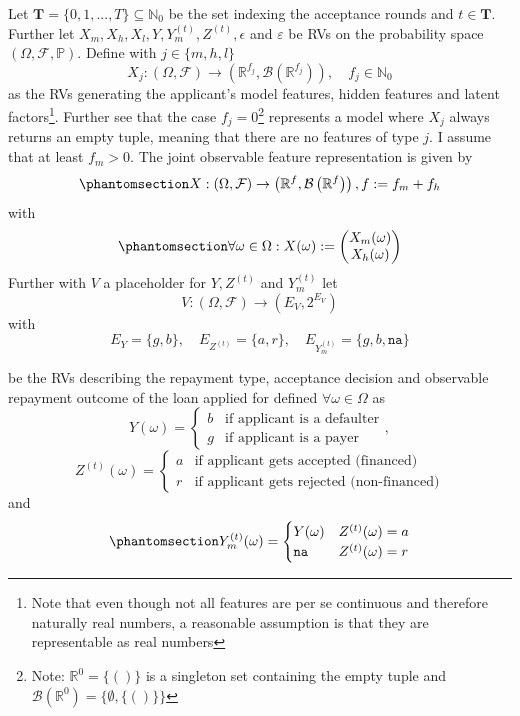 \documentclass[
  12pt,
]{article}
\begin{document}
Let \(\mathbf{T} = \{0, 1, ..., T\} \subseteq {\mathbb{N}}_0\) be the
set indexing the acceptance rounds and \(t \in \mathbf{T}\). Further let
\(X_m, X_h, X_l, Y, Y_m^{(t)}, Z^{(t)}, \epsilon\) and \(\varepsilon\)
be RVs on the probability space \((\Omega, \mathcal{F}, \mathbb{P})\).
Define with \(j \in \{m, h, l\}\) \[
X_j: (\Omega, \mathcal{F}) \to \left(\mathbb{R}^{f_j}, \mathcal{B}(\mathbb{R}^{f_j}) \right), \quad
f_j \in \mathbb{N}_0
\] as the RVs generating the applicant's model features, hidden features
and latent factors\footnote{ Note that even though not all features are
  per se continuous and therefore naturally real numbers, a reasonable
  assumption is that they are representable as real numbers}. Further
see that the case \(f_j = 0\)\footnote{Note: \(\mathbb{R}^{0} = \{()\}\)
  is a singleton set containing the empty tuple and
  \(\mathcal{B}\left(\mathbb{R}^{0}\right) = \{\emptyset, \{()\}\}\)}
represents a model where \(X_j\) always returns an empty tuple, meaning
that there are no features of type \(j\). I assume that at least
\(f_m > 0\). The joint observable feature representation is given by
\begin{equation}\protect\phantomsection\label{eq-X-map-definition}{
X : (\Omega, \mathcal{F}) \to \left(\mathbb{R}^{f}, \mathcal{B}\left(\mathbb{R}^{f} \right) \right), f:=f_m + f_h
}\end{equation} with
\begin{equation}\protect\phantomsection\label{eq-X-joint-observable-feats-vec}{
\forall \omega \in \Omega: X(\omega) := \begin{pmatrix} X_m(\omega) \\ X_h(\omega) \end{pmatrix}
}\end{equation} Further with \(V\) a placeholder for \(Y, Z^{(t)}\) and
\(Y_m^{(t)}\) let \[
V : (\Omega, \mathcal{F}) \to \left( E_V, 2^{E_V} \right)
\] with \[
E_Y = \{g,b\}, \quad E_{Z^{(t)}} = \{a,r\}, \quad E_{Y_m^{(t)}} = \{g,b, \texttt{na}\}
\]

be the RVs describing the repayment type, acceptance decision and
observable repayment outcome of the loan applied for defined
\(\forall \omega \in \Omega\) as \[
Y(\omega) = \begin{cases}
    b & \text{if applicant is a defaulter} \\
    g & \text{if applicant is a payer}
\end{cases} ,
\] \[
Z^{(t)}(\omega) = \begin{cases}
    a & \text{if applicant gets accepted (financed)} \\
    r & \text{if applicant gets rejected (non-financed)}
\end{cases}
\] and
\begin{equation}\protect\phantomsection\label{eq-y-m-t-as-measurable-function}{
Y_m^{(t)}(\omega) = \begin{cases}
    Y(\omega) & Z^{(t)}(\omega) = a \\
    \texttt{na} & Z^{(t)}(\omega) = r
\end{cases}
}\end{equation}
\end{document}
